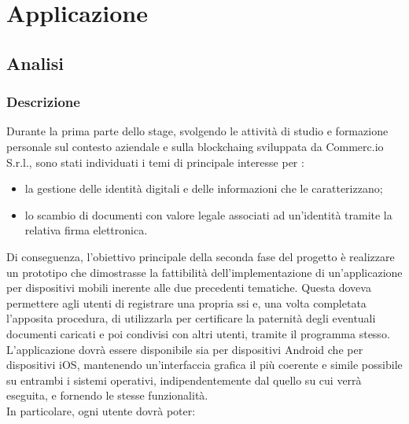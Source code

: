 
\chapter{Applicazione}
\label{cap:applicazione}

\section{Analisi}

\subsection{Descrizione}

Durante la prima parte dello stage, svolgendo le attività di studio e formazione personale sul contesto aziendale e sulla \gls{blockchaing} sviluppata da Commerc.io S.r.l., sono stati individuati i temi di principale interesse per \myCompany{} \companyTitle:

\begin{itemize}
	\item la gestione delle identità digitali e delle informazioni che le caratterizzano;
	\item lo scambio di documenti con valore legale associati ad un'identità tramite la relativa firma elettronica.
\end{itemize}

Di conseguenza, l'obiettivo principale della seconda fase del progetto è  realizzare un prototipo che dimostrasse la fattibilità dell'implementazione di un'applicazione per dispositivi mobili inerente alle due precedenti tematiche. Questa doveva permettere agli utenti di registrare una propria \gls{ssi} e, una volta completata l'apposita procedura, di utilizzarla per certificare la paternità degli eventuali documenti caricati e poi condivisi con altri utenti, tramite il programma stesso.\\
L'applicazione dovrà essere disponibile sia per dispositivi Android che per dispositivi iOS, mantenendo un'interfaccia grafica il più coerente e simile possibile su entrambi i sistemi operativi, indipendentemente dal quello su cui verrà eseguita, e fornendo le stesse funzionalità. \\
In particolare, ogni utente dovrà poter:

